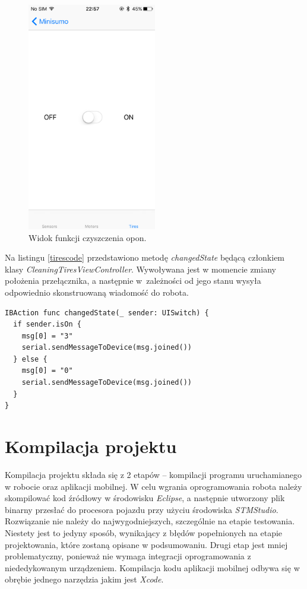 \begin{figure}[H]
	\centering
		\includegraphics[width=0.75\linewidth, height=10cm, keepaspectratio, fbox]{pic05/tires.PNG}
	\caption{Widok funkcji czyszczenia opon.}
	\label{fig:tires}	
\end{figure}

Na listingu \ref{tirescode} przedstawiono metodę \textit{changedState} będącą członkiem klasy \textit{CleaningTiresViewController}. Wywoływana jest w momencie zmiany położenia przełącznika, a następnie w~zależności od jego stanu wysyła odpowiednio skonstruowaną wiadomość do robota.  

\begin{minipage}{\textwidth}
	\begin{lstlisting}[label=tirescode,caption=Nasłuchiwanie zmiany położenia przełącznika.]
IBAction func changedState(_ sender: UISwitch) {
  if sender.isOn {
    msg[0] = "3"
    serial.sendMessageToDevice(msg.joined())
  } else {
    msg[0] = "0"
    serial.sendMessageToDevice(msg.joined())
  }
}
	\end{lstlisting}
\end{minipage}

\newpage
 
\section{Kompilacja projektu}
Kompilacja projektu składa się z 2 etapów – kompilacji programu uruchamianego w robocie oraz aplikacji mobilnej. W celu wgrania oprogramowania robota należy skompilować kod źródłowy w środowisku \textit{Eclipse}, a następnie utworzony plik binarny przesłać do procesora pojazdu przy użyciu środowiska \textit{STMStudio}. Rozwiązanie nie należy do najwygodniejszych, szczególnie na etapie testowania. Niestety jest to jedyny sposób, wynikający z błędów popełnionych na etapie projektowania, które zostaną opisane w podsumowaniu. Drugi etap jest mniej problematyczny, ponieważ nie wymaga integracji oprogramowania z niededykowanym urządzeniem.  Kompilacja kodu aplikacji mobilnej odbywa się w obrębie jednego narzędzia jakim jest \textit{Xcode}. 

